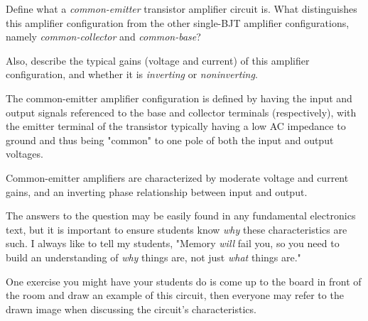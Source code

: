 

Define what a {\it common-emitter} transistor amplifier circuit is.  What distinguishes this amplifier configuration from the other single-BJT amplifier configurations, namely {\it common-collector} and {\it common-base}?

Also, describe the typical gains (voltage and current) of this amplifier configuration, and whether it is {\it inverting} or {\it noninverting}.







The common-emitter amplifier configuration is defined by having the input and output signals referenced to the base and collector terminals (respectively), with the emitter terminal of the transistor typically having a low AC impedance to ground and thus being "common" to one pole of both the input and output voltages.  

Common-emitter amplifiers are characterized by moderate voltage and current gains, and an inverting phase relationship between input and output.







The answers to the question may be easily found in any fundamental electronics text, but it is important to ensure students know {\it why} these characteristics are such.  I always like to tell my students, "Memory {\it will} fail you, so you need to build an understanding of {\it why} things are, not just {\it what} things are."

One exercise you might have your students do is come up to the board in front of the room and draw an example of this circuit, then everyone may refer to the drawn image when discussing the circuit's characteristics.




